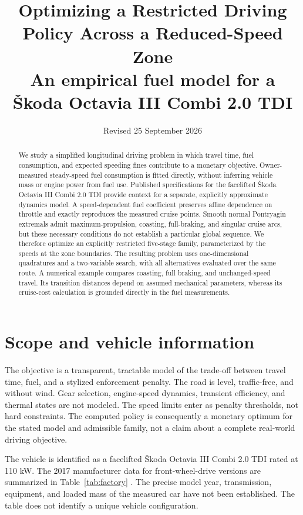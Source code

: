 \documentclass[10pt,a4paper]{article}
\title{Optimizing a Restricted Driving Policy Across a Reduced-Speed Zone\\[3pt]
\large An empirical fuel model for a \v{S}koda Octavia III Combi 2.0 TDI}
\author{}
\date{Revised 25 September 2026}
\begin{document}
\maketitle
\begin{abstract}
We study a simplified longitudinal driving problem in which travel time, fuel consumption, and expected speeding fines contribute to a monetary objective. Owner-measured steady-speed fuel consumption is fitted directly, without inferring vehicle mass or engine power from fuel use. Published specifications for the facelifted \v{S}koda Octavia III Combi 2.0 TDI provide context for a separate, explicitly approximate dynamics model. A speed-dependent fuel coefficient preserves affine dependence on throttle and exactly reproduces the measured cruise points. Smooth normal Pontryagin extremals admit maximum-propulsion, coasting, full-braking, and singular cruise arcs, but these necessary conditions do not establish a particular global sequence. We therefore optimize an explicitly restricted five-stage family, parameterized by the speeds at the zone boundaries. The resulting problem uses one-dimensional quadratures and a two-variable search, with all alternatives evaluated over the same route. A numerical example compares coasting, full braking, and unchanged-speed travel. Its transition distances depend on assumed mechanical parameters, whereas its cruise-cost calculation is grounded directly in the fuel measurements.
\end{abstract}

\section{Scope and vehicle information}
The objective is a transparent, tractable model of the trade-off between travel time, fuel, and a stylized enforcement penalty. The road is level, traffic-free, and without wind. Gear selection, engine-speed dynamics, transient efficiency, and thermal states are not modeled. The speed limits enter as penalty thresholds, not hard constraints. The computed policy is consequently a monetary optimum for the stated model and admissible family, not a claim about a complete real-world driving objective.

The vehicle is identified as a facelifted \v{S}koda Octavia III Combi 2.0 TDI rated at 110 kW. The 2017 manufacturer data for front-wheel-drive versions are summarized in Table~\ref{tab:factory} \cite{skoda}. The precise model year, transmission, equipment, and loaded mass of the measured car have not been established. The table does not identify a unique vehicle configuration.
\end{document}
